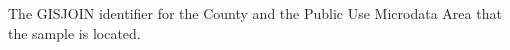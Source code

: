 The GISJOIN identifier for the County and the Public Use Microdata Area that the sample is located.
